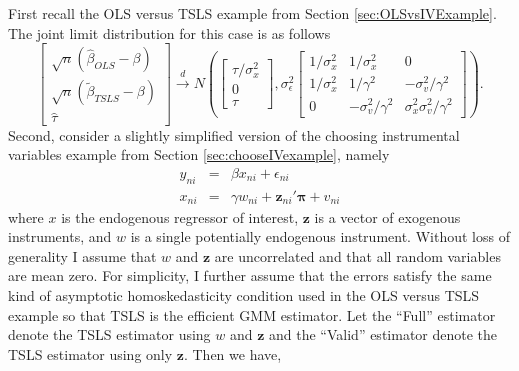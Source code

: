 First recall the OLS versus TSLS example from Section \ref{sec:OLSvsIVExample}.
The joint limit distribution for this case is as follows
\begin{equation*}
  \left[ 
  \begin{array}{c}
    \sqrt{n} \left( \widehat{\beta}_{OLS} - \beta \right)\\
    \sqrt{n} \left( \widetilde{\beta}_{TSLS} - \beta \right)\\
    \widehat{\tau}
\end{array}
\right] \overset{d}{\rightarrow} N\left( \left[
\begin{array}{c}
  \tau/\sigma_x^2 \\ 0 \\ \tau
\end{array}
\right], \sigma_{\epsilon}^2 
\left[
\begin{array}{ccc}
  1/\sigma_x^2 & 1/\sigma_x^2 & 0\\
  1/\sigma_x^2 & 1/\gamma^2 & -\sigma_v^2/\gamma^2\\
  0 & -\sigma_v^2/\gamma^2 & \sigma_x^2 \sigma_v^2/\gamma^2
\end{array}
\right]\right).
\end{equation*}
Second, consider a slightly simplified version of the choosing instrumental variables example from Section \ref{sec:chooseIVexample}, namely
\begin{eqnarray*}
  y_{ni} &=& \beta x_{ni} + \epsilon_{ni}\\
  x_{ni} &=& \gamma w_{ni} + \mathbf{z}_{ni}' \boldsymbol{\pi} + v_{ni}
\end{eqnarray*}
where $x$ is the endogenous regressor of interest, $\mathbf{z}$ is a vector of exogenous instruments, and $w$ is a single potentially endogenous instrument.
Without loss of generality I assume that $w$ and $\mathbf{z}$ are uncorrelated and that all random variables are mean zero.
For simplicity, I further assume that the errors satisfy the same kind of asymptotic homoskedasticity condition used in the OLS versus TSLS example so that TSLS is the efficient GMM estimator.
Let the ``Full'' estimator denote the TSLS estimator using $w$ and $\mathbf{z}$ and the ``Valid'' estimator denote the TSLS estimator using only $\mathbf{z}$.
Then we have,

